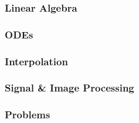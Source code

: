 \documentclass[14pt,compress]{beamer}
\begin{document}
\begin{frame}[fragile]
  \frametitle{Linear Algebra}

\end{frame}
\begin{frame}[fragile]
  \frametitle{ODEs}

\end{frame}
\begin{frame}[fragile]
  \frametitle{Interpolation}

\end{frame}

\begin{frame}[fragile]
  \frametitle{Signal \& Image Processing}

\end{frame}

\begin{frame}[fragile]
  \frametitle{Problems}

\end{frame}
\end{document}
